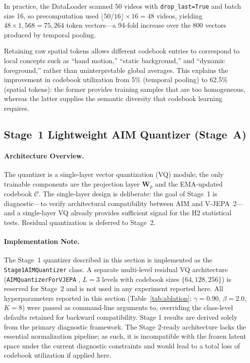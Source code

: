 \documentclass{article}
\begin{document}
In practice, the DataLoader scanned 50 videos with \texttt{drop\_last=True} and
batch size 16, so precomputation used
$\lfloor 50/16\rfloor \times 16 = 48$ videos, yielding
$48 \times 1{,}568 = 75{,}264$ token vectors---a 94-fold increase over the
800 vectors produced by temporal pooling.

Retaining raw spatial tokens allows different codebook entries to correspond to
local concepts such as ``hand motion,'' ``static background,'' and ``dynamic
foreground,'' rather than uninterpretable global averages.  This explains the
improvement in codebook utilization from 5\% (temporal pooling) to 62.5\%
(spatial tokens): the former provides training samples that are too homogeneous,
whereas the latter supplies the semantic diversity that codebook learning
requires.

\subsection{Stage~1 Lightweight AIM Quantizer (Stage~A)}\label{sec:quantizer}

\paragraph{Architecture Overview.}
The quantizer is a single-layer vector quantization (VQ) module; the only
trainable components are the projection layer $\mathbf{W}_p$ and the
EMA-updated codebook $\mathcal{C}$.  The single-layer design is deliberate:
the goal of Stage~1 is diagnostic---to verify architectural compatibility
between AIM and V-JEPA~2---and a single-layer VQ already provides sufficient
signal for the H2 statistical tests.  Residual quantization is deferred to
Stage~2.
\paragraph{Implementation Note.}
The Stage~1 quantizer described in this section is implemented as the
\texttt{Stage1AIMQuantizer} class.
A separate multi-level residual VQ architecture (\texttt{AIMQuantizerForVJEPA}
, $L = 3$ levels with codebook sizes
$\{64, 128, 256\}$) is reserved for Stage~2 and is not used in any
experiment reported here.  All hyperparameters reported in this section
(Table~\ref{tab:ablation}: $\gamma = 0.90$, $\beta = 2.0$, $K = 8$)
were passed as command-line arguments to,
overriding the class-level defaults retained for backward compatibility.
Stage 1 results are derived solely from the primary diagnostic framework. The Stage 2-ready architecture lacks the essential normalization pipeline; as such, it is incompatible with the frozen latent space under the current diagnostic constraints and would lead to a total loss of codebook utilization if applied here.
\end{document}
